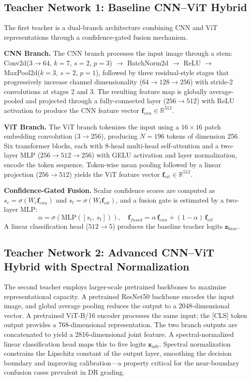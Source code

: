 \documentclass[a4paper,fleqn]{cas-dc}
\begin{document}
\subsection{Teacher Network 1: Baseline CNN--ViT Hybrid}

The first teacher is a dual-branch architecture combining CNN and ViT representations through a confidence-gated fusion mechanism.

\textbf{CNN Branch.} The CNN branch processes the input image through a stem: Conv2d($3{\to}64$, $k{=}7$, $s{=}2$, $p{=}3$) $\to$ BatchNorm2d $\to$ ReLU $\to$ MaxPool2d($k{=}3$, $s{=}2$, $p{=}1$), followed by three residual-style stages that progressively increase channel dimensionality ($64{\to}128{\to}256$) with stride-2 convolutions at stages 2 and 3. The resulting feature map is globally average-pooled and projected through a fully-connected layer ($256{\to}512$) with ReLU activation to produce the CNN feature vector $\mathbf{f}_{cnn} \in \mathbb{R}^{512}$.

\textbf{ViT Branch.} The ViT branch tokenizes the input using a $16{\times}16$ patch embedding convolution ($3{\to}256$), producing $N{=}196$ tokens of dimension 256. Six transformer blocks, each with 8-head multi-head self-attention and a two-layer MLP ($256{\to}512{\to}256$) with GELU activation and layer normalization, encode the token sequence. Token-wise mean pooling followed by a linear projection ($256{\to}512$) yields the ViT feature vector $\mathbf{f}_{vit} \in \mathbb{R}^{512}$.

\textbf{Confidence-Gated Fusion.} Scalar confidence scores are computed as $s_c = \sigma(W_c \mathbf{f}_{cnn})$ and $s_t = \sigma(W_t \mathbf{f}_{vit})$, and a fusion gate is estimated by a two-layer MLP:
\begin{equation}
  \alpha = \sigma\!\left(\text{MLP}([s_c,\, s_t])\right), \quad
  \mathbf{f}_{fused} = \alpha\, \mathbf{f}_{cnn} + (1{-}\alpha)\, \mathbf{f}_{vit}
\end{equation}
A linear classification head ($512{\to}5$) produces the baseline teacher logits $\mathbf{z}_{base}$.

\subsection{Teacher Network 2: Advanced CNN--ViT Hybrid with Spectral Normalization}

The second teacher employs larger-scale pretrained backbones to maximize representational capacity. A pretrained ResNet50 backbone encodes the input image, and global average pooling reduces the output to a 2048-dimensional vector. A pretrained ViT-B/16 encoder processes the same input; the [CLS] token output provides a 768-dimensional representation. The two branch outputs are concatenated to yield a 2816-dimensional joint feature. A spectral-normalized linear classification head \cite{miyato2018} maps this to five logits $\mathbf{z}_{adv}$. Spectral normalization constrains the Lipschitz constant of the output layer, smoothing the decision boundary and improving calibration---a property critical for the near-boundary confusion cases prevalent in DR grading.
\end{document}
